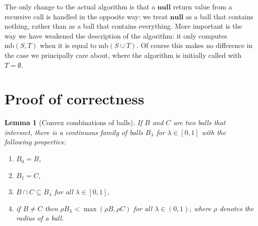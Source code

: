 \documentclass[a4paper]{article}
\newtheorem{lemma}{Lemma}[section]
\newcommand\undef{\mathbf{null}}
\newcommand\mb{\mathrm{mb}}
\let\boundary\partial
\let\radius\rho
\begin{document}
\noindent The only change to the actual algorithm is that a $\undef$ return value from a recursive call is handled in the opposite way: we treat $\undef$ as a ball that contains nothing, rather than as a ball that contains everything. More important is the way we have weakened the description of the algorithm: it only computes $\mb(S, T)$ when it is equal to $\mb(S\cup T)$. Of course this makes no difference in the case we principally care about, where the algorithm is initially called with $T=\emptyset$.

\section{Proof of correctness}
\begin{lemma}[Convex combinations of balls]\label{lemma:cc}
  If $B$ and $C$ are two balls that intersect, there is a continuous family of balls $B_\lambda$ for $\lambda\in[0,1]$ with the following properties:
  \def\theenumi{\normalfont\roman{enumi})}\let\labelenumi\theenumi
  \begin{enumerate}
    \item\label{item:cc:0} $B_0=B$,
    \item\label{item:cc:1} $B_1=C$,
    \item\label{item:cc:intersection} $B\cap C\subseteq B_\lambda$ for all $\lambda\in[0,1]$,
    \item\label{item:cc:radius} if $B\neq C$ then $\radius B_\lambda < \max(\radius B, \radius C)$ for all $\lambda\in(0,1)$, where $\radius$ denotes the radius of a ball.
  \end{enumerate}
\end{lemma}
\end{document}
